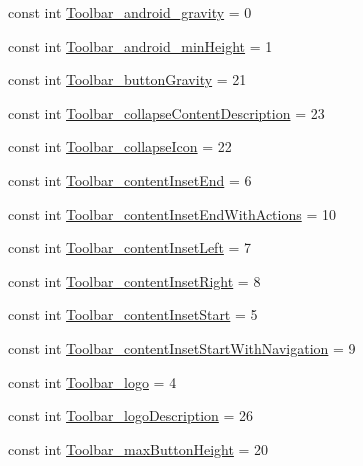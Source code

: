 \begin{CompactItemize}
const int \hyperlink{class__2doo_1_1_droid_1_1_resource_1_1_styleable_f961db8fd5cfe80b099b08c8483942f9}{Toolbar\_\-android\_\-gravity} = 0
\item 
const int \hyperlink{class__2doo_1_1_droid_1_1_resource_1_1_styleable_67781e3fc6dabaa9df3b50eb6e95d0fb}{Toolbar\_\-android\_\-minHeight} = 1
\item 
const int \hyperlink{class__2doo_1_1_droid_1_1_resource_1_1_styleable_1bf435da1ceb0da3b175a9ee2e0035fe}{Toolbar\_\-buttonGravity} = 21
\item 
const int \hyperlink{class__2doo_1_1_droid_1_1_resource_1_1_styleable_2c7f9017ba5254012195ec08b652705a}{Toolbar\_\-collapseContentDescription} = 23
\item 
const int \hyperlink{class__2doo_1_1_droid_1_1_resource_1_1_styleable_dcdf8fe09a2e9e0bcf3387b3a964dfca}{Toolbar\_\-collapseIcon} = 22
\item 
const int \hyperlink{class__2doo_1_1_droid_1_1_resource_1_1_styleable_47e22c13b7873c76e9ddbc281d43aca1}{Toolbar\_\-contentInsetEnd} = 6
\item 
const int \hyperlink{class__2doo_1_1_droid_1_1_resource_1_1_styleable_543f425e8b552d15d521a6fd1f679834}{Toolbar\_\-contentInsetEndWithActions} = 10
\item 
const int \hyperlink{class__2doo_1_1_droid_1_1_resource_1_1_styleable_7300ac434654427d3ff6a4f902d12503}{Toolbar\_\-contentInsetLeft} = 7
\item 
const int \hyperlink{class__2doo_1_1_droid_1_1_resource_1_1_styleable_45c3a8cafb1a170e82aa3de810d389d6}{Toolbar\_\-contentInsetRight} = 8
\item 
const int \hyperlink{class__2doo_1_1_droid_1_1_resource_1_1_styleable_77a627dde0f797155b6ee378d24fb6a7}{Toolbar\_\-contentInsetStart} = 5
\item 
const int \hyperlink{class__2doo_1_1_droid_1_1_resource_1_1_styleable_1c19b65526a4678360ffb796b5c40620}{Toolbar\_\-contentInsetStartWithNavigation} = 9
\item 
const int \hyperlink{class__2doo_1_1_droid_1_1_resource_1_1_styleable_04c3eda27ffcf3c67f658bfe989033b0}{Toolbar\_\-logo} = 4
\item 
const int \hyperlink{class__2doo_1_1_droid_1_1_resource_1_1_styleable_067172f74203f425c6263f3d826327c8}{Toolbar\_\-logoDescription} = 26
\item 
const int \hyperlink{class__2doo_1_1_droid_1_1_resource_1_1_styleable_5fe9524f3964fe84cbe1b23bc863d72d}{Toolbar\_\-maxButtonHeight} = 20
\item 

\end{CompactItemize}
